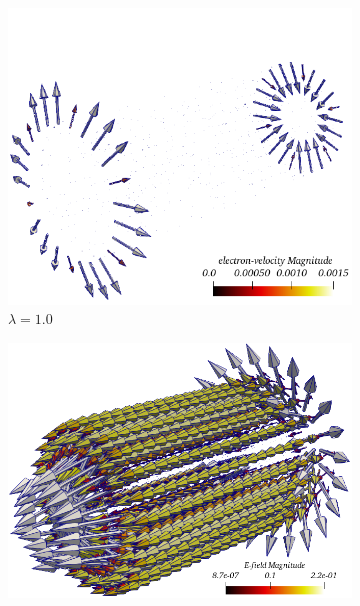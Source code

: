 \documentclass{article}
\begin{document}
\begin{figure}
\begin{subfigure}[b]{\textwidth}
        \includegraphics[scale=0.2]{paper_version/figures/electronVel_lambda-1.png}
        \caption{\colorbox{yellow!30}{$\lambda = 1.0$}}
    \end{subfigure}
     \begin{subfigure}[b]{\textwidth}
        \hspace{-1cm}
        \includegraphics[scale=0.2]{paper_version/figures/E-field_lambda-1e-1.png}

\end{subfigure}
\end{figure}
\end{document}
